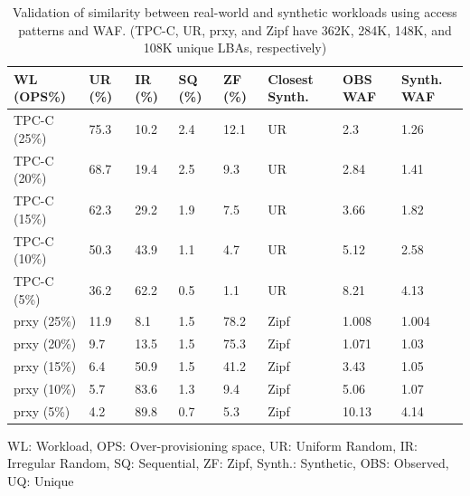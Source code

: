 \documentclass{ieeeaccess}
\begin{document}
\begin{table}
    \centering
    \caption{ Validation of similarity between real-world and synthetic workloads using access patterns and WAF. (TPC-C, UR, prxy, and Zipf have 362K, 284K, 148K, and 108K unique LBAs, respectively)}
    \label{table:similarity_synthetic_realworld}
    \begin{tabular}{|p{.9cm}|p{.35cm}|p{.35cm}|p{.35cm}|p{.35cm}|p{.9cm}|p{.8cm}|p{.8cm}|}
        \hline
        \textbf{WL (OPS\%)} & \textbf{UR (\%)} & \textbf{IR (\%)} & \textbf{SQ (\%)} & \textbf{ZF (\%)} & \textbf{Closest Synth.} & \textbf{OBS WAF} & \textbf{Synth. WAF} \\
        \hline
        TPC-C (25\%) & 75.3 & 10.2 & 2.4 & 12.1 & UR & 2.3 & 1.26\\
        \hline
        TPC-C (20\%) & 68.7 & 19.4 & 2.5 & 9.3 & UR & 2.84 & 1.41\\
        \hline
        TPC-C (15\%) & 62.3 & 29.2 & 1.9 & 7.5 & UR & 3.66 & 1.82\\
        \hline
        TPC-C (10\%) & 50.3 & 43.9 & 1.1 & 4.7 & UR & 5.12 & 2.58\\
        \hline
        TPC-C (5\%) & 36.2 & 62.2 & 0.5 & 1.1 & UR & 8.21 & 4.13\\
        \hline
        prxy (25\%) & 11.9 & 8.1 & 1.5 & 78.2 & Zipf & 1.008 & 1.004\\
        \hline
        prxy (20\%) & 9.7 & 13.5 & 1.5 & 75.3 & Zipf & 1.071 & 1.03\\
        \hline
        prxy (15\%) & 6.4 & 50.9 & 1.5 & 41.2 & Zipf & 3.43 & 1.05\\
        \hline
        prxy (10\%) & 5.7 & 83.6 & 1.3 & 9.4 & Zipf & 5.06 & 1.07\\
        \hline
        prxy (5\%) & 4.2 & 89.8 & 0.7 & 5.3 & Zipf & 10.13 & 4.14\\
        \hline
    \end{tabular}
    WL: Workload,
    OPS: Over-provisioning space,
    UR: Uniform Random,
    IR: Irregular Random,
    SQ: Sequential,
    ZF: Zipf,
    Synth.: Synthetic,
    OBS: Observed,
    UQ: Unique
\end{table}
\end{document}
